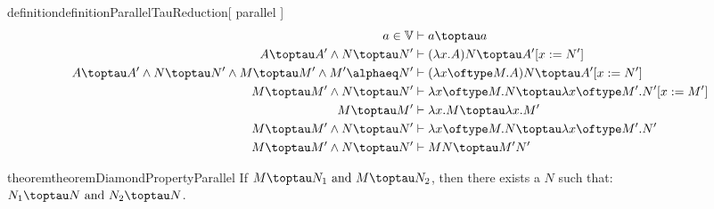 \begin{reusable}{definition}{definitionParallelTauReduction}[ parallel \taureduction]
    \begin{align}
        a \in \mathbb{V} & \vdash a \toptau a \\
        A \toptau A' \land N \toptau N' & \vdash (\lambda x.A)N \toptau A'[x := N'] \\
        A \toptau A' \land N \toptau N' \land M \toptau M' \land M' \alphaeq N' & \vdash (\lambda x \oftype M.A)N \toptau A'[x := N'] \\
        M \toptau M' \land N \toptau N' & \vdash \lambda x \oftype M.N \toptau \lambda x \oftype M'.N'[x := M'] \\
        M \toptau M' & \vdash  \lambda x.M \toptau \lambda x.M' \\
        M \toptau M' \land N \toptau N' & \vdash \lambda x \oftype M.N \toptau \lambda x \oftype M'.N' \\
        M \toptau M' \land N \toptau N' & \vdash MN \toptau M'N'
    \end{align}
\end{reusable}

\begin{reusable}{theorem}{theoremDiamondPropertyParallel}
    If $M \toptau N_{1}\text{ and }M \toptau N_{2}$, then there exists a $N$ such that: $N_{1} \toptau N \text{ and }N_{2} \toptau N$.
\end{reusable}

